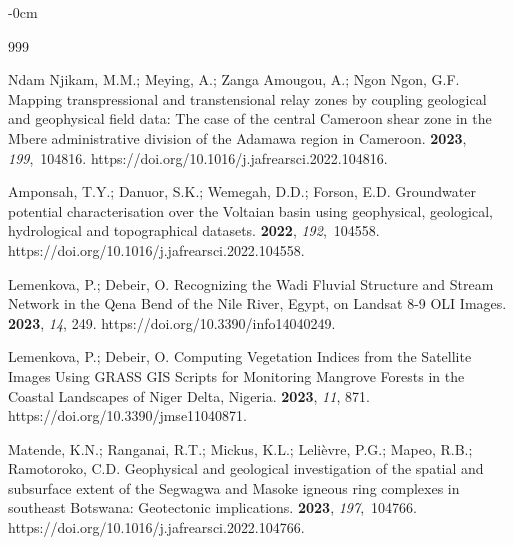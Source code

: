 \documentclass[minerals,article,accept,pdftex,moreauthors]{Definitions/mdpi}
\begin{document}
\begin{adjustwidth}{-\extralength}{0cm}


%

\begin{thebibliography}{999}

{Ndam Njikam}, M.M.; Meying, A.; {Zanga Amougou}, A.; {Ngon Ngon}, G.F.
\newblock Mapping transpressional and transtensional relay zones by coupling
  geological and geophysical field data: The case of the central Cameroon shear
  zone in the Mbere administrative division of the Adamawa region in Cameroon.
 {\bf 2023}, {\em
  199},~104816.
\newblock https://doi.org/10.1016/j.jafrearsci.2022.104816.

Amponsah, T.Y.; Danuor, S.K.; Wemegah, D.D.; Forson, E.D.
\newblock Groundwater potential characterisation over the Voltaian basin using
  geophysical, geological, hydrological and topographical datasets.
 {\bf 2022}, {\em
  192},~104558.
\newblock https://doi.org/10.1016/j.jafrearsci.2022.104558.

Lemenkova, P.; Debeir, O.
\newblock Recognizing the Wadi Fluvial Structure and Stream Network in the Qena
  Bend of the Nile River, Egypt, on Landsat 8-9 OLI Images.
 {\bf 2023}, {\em 14}, 249. %
\newblock https://doi.org/10.3390/info14040249.

Lemenkova, P.; Debeir, O.
\newblock Computing Vegetation Indices from the Satellite Images Using GRASS
  GIS Scripts for Monitoring Mangrove Forests in the Coastal Landscapes of
  Niger Delta, Nigeria.
 {\bf 2023}, {\em 11}, 871. %
\newblock https://doi.org/10.3390/jmse11040871.

Matende, K.N.; Ranganai, R.T.; Mickus, K.L.; Lelièvre, P.G.; Mapeo, R.B.;
  Ramotoroko, C.D.
\newblock Geophysical and geological investigation of the spatial and
  subsurface extent of the Segwagwa and Masoke igneous ring complexes in
  southeast Botswana: Geotectonic implications.
 {\bf 2023}, {\em
  197},~104766.
\newblock https://doi.org/10.1016/j.jafrearsci.2022.104766.


\end{thebibliography}
\end{adjustwidth}
\end{document}

